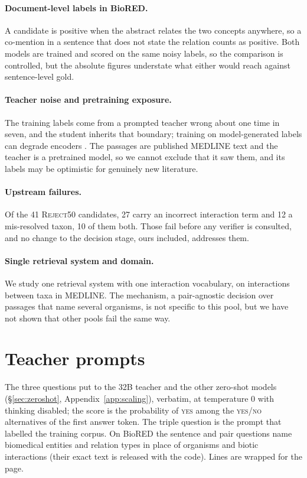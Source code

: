 \documentclass[11pt]{article}
\begin{document}
\paragraph{Document-level labels in BioRED.}
A candidate is positive when the abstract relates the two concepts anywhere, so a co-mention
in a sentence that does not state the relation counts as positive. Both models are trained and scored
on the same noisy labels, so the comparison is controlled, but the absolute figures understate what
either would reach against sentence-level gold.

\paragraph{Teacher noise and pretraining exposure.}
The training labels come from a prompted teacher wrong about one time in seven, and the student
inherits that boundary; training on model-generated labels can degrade encoders
\citep{lu2025feeding}. The passages are published MEDLINE text and the teacher is a pretrained
model, so we cannot exclude that it saw them, and its labels may be optimistic for genuinely new
literature.

\paragraph{Upstream failures.}
Of the 41 \textsc{Reject50} candidates, 27 carry an incorrect interaction term and 12
a mis-resolved taxon, 10 of them both. Those fail before any verifier is consulted, and no change to
the decision stage, ours included, addresses them.

\paragraph{Single retrieval system and domain.}
We study one retrieval system with one interaction vocabulary, on interactions between taxa in MEDLINE. The
mechanism, a pair-agnostic decision over passages that name several organisms, is not specific to
this pool, but we have not shown that other pools fail the same way.



\appendix

\section{Teacher prompts}
\label{app:prompts}

The three questions put to the 32B teacher and the other zero-shot models (\S\ref{sec:zeroshot},
Appendix~\ref{app:scaling}), verbatim, at temperature 0 with thinking disabled; the score is the
probability of \textsc{yes} among the \textsc{yes}/\textsc{no} alternatives of the first answer
token. The triple question is the prompt that labelled the training corpus. On BioRED the sentence
and pair questions name biomedical entities and relation types in place of organisms and biotic
interactions (their exact text is released with the code). Lines are wrapped for the page.
\end{document}
